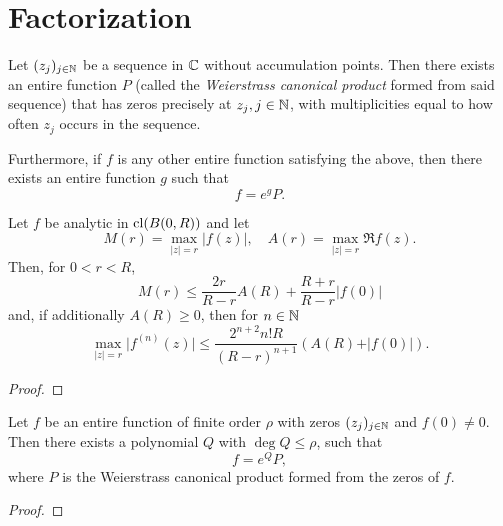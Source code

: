 \chapter{Factorization}
\label{ch:factorization}



\begin{theorem} [Weierstrass]
    Let $(z_j)_{j \in \mathbb{N}}$ be a sequence in $\mathbb{C}$ without accumulation points. Then there exists an entire function $P$ (called the \emph{Weierstrass canonical product} formed from said sequence) that has zeros precisely at $z_j, j \in \mathbb{N}$, with multiplicities equal to how often $z_j$ occurs in the sequence.

    Furthermore, if $f$ is any other entire function satisfying the above, then there exists an entire function $g$ such that
    $$ f = e^g P. $$
\end{theorem}


\begin{lemma}
    Let $f$ be analytic in $\operatorname{cl}(B(0, R))$ and let
    $$ M(r) = \max_{\vert z \vert = r} \vert f(z) \vert, \quad A(r) = \max_{\vert z \vert = r} \Re f(z). $$
    Then, for $0 < r < R$,
    $$ M(r) \leq \frac{2r}{R - r} A(R) + \frac{R + r}{R - r} \vert f(0) \vert $$
    and, if additionally $A(R) \geq 0$, then for $n \in \mathbb{N}$
    $$ \max_{\vert z \vert = r} \vert f^{(n)}(z) \vert \leq \frac{2^{n+2} n! R}{(R - r)^{n+1}} (A(R) + \vert f(0) \vert). $$
\end{lemma}

\begin{proof}
\end{proof}

\begin{theorem}[Hadamard]
    Let $f$ be an entire function of finite order $\rho$ with zeros $(z_j)_{j \in \mathbb{N}}$ and $f(0) \neq 0$. Then there exists a polynomial $Q$ with $\deg Q \leq \rho$, such that
    $$ f = e^Q P, $$
    where $P$ is the Weierstrass canonical product formed from the zeros of $f$.
\end{theorem}

\begin{proof}
\end{proof}